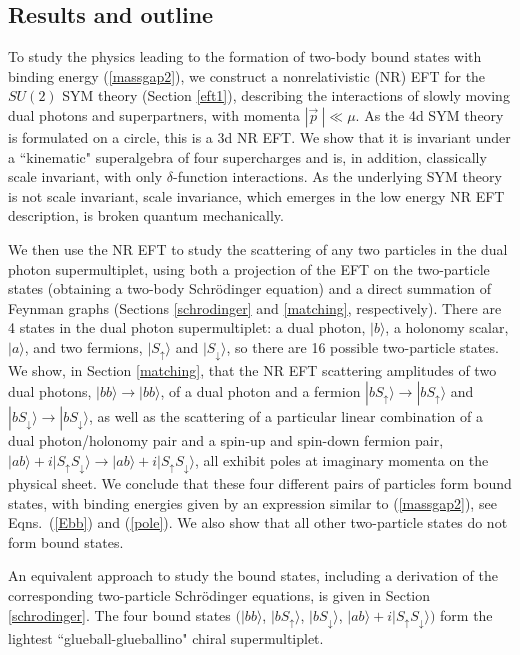 \documentclass[11pt]{article}
\begin{document}
\subsection{Results and outline} 

To study the physics leading to the formation of two-body bound states with binding energy (\ref{massgap2}), we construct a nonrelativistic (NR) EFT for the  $SU(2)$ SYM theory (Section \ref{eft1}), describing the interactions of slowly moving dual photons and superpartners,   with momenta $|\vec{p}\:| \ll \mu$. As the 4d SYM theory is formulated on a circle, this is a  3d NR EFT. We show that it is invariant under a ``kinematic" superalgebra of four supercharges and is, in addition,  classically scale invariant, with only $\delta$-function interactions. As the underlying SYM theory is not scale invariant, scale invariance, which emerges in the low energy NR EFT description, is broken quantum mechanically.

We then use the NR EFT to study the scattering of any two particles in the dual photon supermultiplet, using both a projection of the EFT on the two-particle states  (obtaining a two-body Schr\"odinger equation) and a  direct summation of Feynman graphs (Sections \ref{schrodinger} and \ref{matching}, respectively). There are 4 states in the dual photon supermultiplet: a dual photon, $|b\rangle$,  a holonomy scalar, $| a \rangle$, and two fermions, $|S_\uparrow\rangle$ and $|S_\downarrow\rangle$, so there are 16 possible two-particle  states. 
 We show, in Section \ref{matching}, that the NR EFT scattering amplitudes of two dual photons, $|bb\rangle \rightarrow |bb\rangle$, of a dual photon and a fermion  $|bS_\uparrow\rangle \rightarrow |bS_\uparrow\rangle$ and $|bS_\downarrow\rangle \rightarrow |bS_\downarrow\rangle$, as well as the scattering of a particular linear combination of  a dual photon/holonomy pair and a spin-up and spin-down fermion pair, $|ab\rangle + i |S_\uparrow
 S_\downarrow \rangle  \rightarrow |ab\rangle + i |S_\uparrow
 S_\downarrow\rangle$, all exhibit poles at imaginary momenta on the physical sheet. We conclude that these four different pairs of particles form bound states, with binding energies given by an expression similar to (\ref{massgap2}), see Eqns.~(\ref{Ebb}) and (\ref{pole}).  We also show that all other two-particle states do not form bound states. 
 
 An equivalent approach to study the bound states, including a derivation  of the corresponding two-particle Schr\"  odinger equations, is given in Section \ref{schrodinger}. The four bound states $(|bb\rangle$, $|bS_\uparrow\rangle$, $|bS_\downarrow\rangle$, $|ab\rangle + i |S_\uparrow
 S_\downarrow \rangle)$  form the lightest ``glueball-glueballino" chiral supermultiplet.
 
\end{document}
